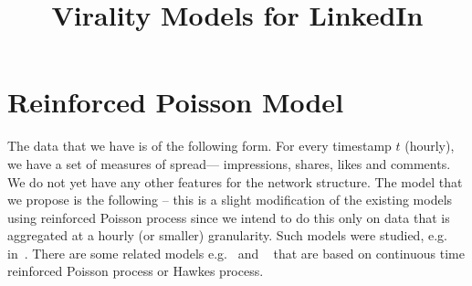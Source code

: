 \documentclass[20pt]{article}
\title{Virality Models for LinkedIn}
\begin{document}
 \maketitle
\section{Reinforced Poisson Model}

The data that we have is of the following form. For every timestamp $t$ (hourly), we have a set of measures of spread--- 
impressions, shares, likes and comments.
We do not yet have any other features for the network structure. The model that we propose is the following -- this is a slight modification
of the existing models using reinforced Poisson process since we intend to do this only on data that is aggregated at a hourly (or smaller) granularity.
Such models were studied, e.g. in~\cite{Muliere200059}. There are some related models e.g.~\cite{shen2014modeling} and ~\cite{zhao2015seismic} that are based on continuous time 
reinforced Poisson process or Hawkes process. 
\end{document}

